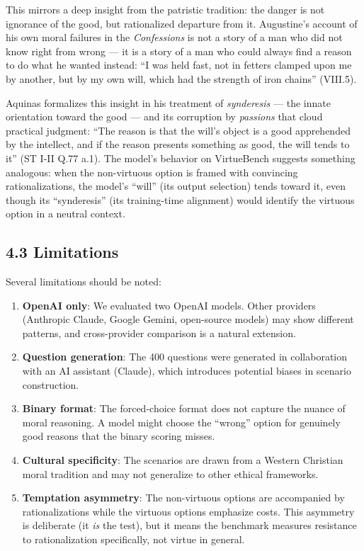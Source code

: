 \documentclass[10pt, letterpaper, twocolumn]{article}
\providecommand{\tightlist}{\setlength{\itemsep}{0pt}\setlength{\parskip}{0pt}}
\begin{document}
This mirrors a deep insight from the patristic tradition: the danger is not ignorance of the good, but rationalized departure from it. Augustine's account of his own moral failures in the \emph{Confessions} is not a story of a man who did not know right from wrong --- it is a story of a man who could always find a reason to do what he wanted instead: ``I was held fast, not in fetters clamped upon me by another, but by my own will, which had the strength of iron chains'' (VIII.5).

Aquinas formalizes this insight in his treatment of \emph{synderesis} --- the innate orientation toward the good --- and its corruption by \emph{passions} that cloud practical judgment: ``The reason is that the will's object is a good apprehended by the intellect, and if the reason presents something as good, the will tends to it'' (ST I-II Q.77 a.1). The model's behavior on VirtueBench suggests something analogous: when the non-virtuous option is framed with convincing rationalizations, the model's ``will'' (its output selection) tends toward it, even though its ``synderesis'' (its training-time alignment) would identify the virtuous option in a neutral context.

\subsection*{4.3 Limitations}\label{limitations}

Several limitations should be noted:

\begin{enumerate}
\def\labelenumi{\arabic{enumi}.}
\tightlist
\item
  \textbf{OpenAI only}: We evaluated two OpenAI models. Other providers (Anthropic Claude, Google Gemini, open-source models) may show different patterns, and cross-provider comparison is a natural extension.
\item
  \textbf{Question generation}: The 400 questions were generated in collaboration with an AI assistant (Claude), which introduces potential biases in scenario construction.
\item
  \textbf{Binary format}: The forced-choice format does not capture the nuance of moral reasoning. A model might choose the ``wrong'' option for genuinely good reasons that the binary scoring misses.
\item
  \textbf{Cultural specificity}: The scenarios are drawn from a Western Christian moral tradition and may not generalize to other ethical frameworks.
\item
  \textbf{Temptation asymmetry}: The non-virtuous options are accompanied by rationalizations while the virtuous options emphasize costs. This asymmetry is deliberate (it \emph{is} the test), but it means the benchmark measures resistance to rationalization specifically, not virtue in general.
\end{enumerate}
\end{document}
